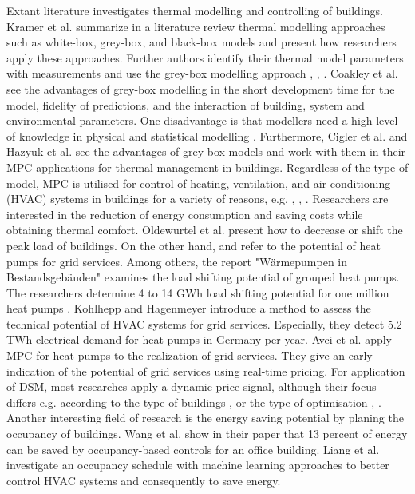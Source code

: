     Extant literature investigates thermal modelling and controlling of buildings. Kramer et al. \cite{Kramer.2012} summarize in a literature review thermal modelling approaches such as white-box, grey-box, and black-box models and present how researchers apply these approaches. Further authors identify their thermal model parameters with measurements and use the grey-box modelling approach \cite{Harb.2016}, \cite{Freund.2020}, \cite{EvelynSperber.2019}. Coakley et al. \cite{Coakley.2014} see the advantages of grey-box modelling in the short development time for the model, fidelity of predictions, and the interaction of building, system and environmental parameters. One disadvantage is that modellers need a high level of knowledge in physical and statistical modelling \cite{Coakley.2014}. Furthermore, Cigler et al. \cite{JiriCigler.} and Hazyuk et al. \cite{Hazyuk.2012b} see the advantages of grey-box models and work with them in their MPC applications for thermal management in buildings. 
    \newline
    Regardless of the type of model, MPC is utilised for control of heating, ventilation, and air conditioning (HVAC)  systems in buildings for a variety of reasons, e.g. \cite{Hazyuk.2012b}, \cite{Zwickel.2019}, \cite{Oldewurtel.2010}. Researchers are interested in the reduction of energy consumption \cite{Hazyuk.2012b} and saving costs \cite{Zwickel.2019} while obtaining thermal comfort. Oldewurtel et al. \cite{Oldewurtel.2010} present how to decrease or shift the peak load of buildings.
    \newline
    On the other hand, \cite{WPimBestand.2020} and \cite{Kohlhepp.2017} refer to the potential of heat pumps for grid services. Among others, the report "Wärmepumpen in Bestandsgebäuden" examines the load shifting potential of grouped heat pumps. The researchers determine 4 to 14 GWh load shifting potential for one million heat pumps \cite{WPimBestand.2020}.
    Kohlhepp and Hagenmeyer \cite{Kohlhepp.2017} introduce a method to assess the technical potential of HVAC systems for grid services. Especially, they detect 5.2 TWh electrical demand for heat pumps in Germany per year.
    \newline
    Avci et al. \cite{Avci.2013} apply MPC for heat pumps to the realization of grid services. They give an early indication of the potential of grid services using real-time pricing. For application of DSM, most researches apply a dynamic price signal, although their focus differs e.g. according to the type of buildings \cite{Bianchini.2019}, \cite{Kim.2018} or the type of optimisation \cite{Bianchini.2019}, \cite{Bianchini.2016}.\newline 
    Another interesting field of research is the energy saving potential by planing the occupancy of buildings. Wang et al. \cite{Wang.2019} show in their paper that 13 percent of energy can be saved by occupancy-based controls for an office building. Liang et al. \cite{Liang.2016} investigate an occupancy schedule with machine learning approaches to better control HVAC systems and consequently to save energy.\newline
    
